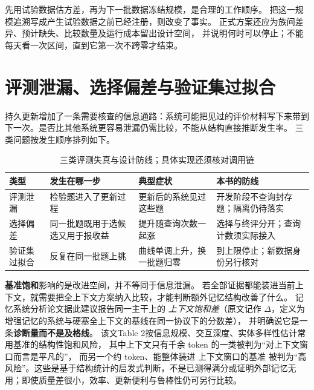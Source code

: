 先用试验数据估方差，再为下一批数据冻结规模，是合理的工作顺序。
把这一规模追溯写成产生试验数据之前已经注册，则改变了事实。
正式方案还应为族间差异、预计缺失、比较数量及运行成本留出设计空间，
并说明何时可以停止；不能每天看一次区间，直到它第一次不跨零才结束。


\section{评测泄漏、选择偏差与验证集过拟合}
\label{sec:ch03-leak}

\begin{sloppypar}
持久更新增加了一条需要核查的信息通路：系统可能把见过的评价材料写下来带到下一次。是否比其他系统更容易泄漏仍需比较，不能从结构直接推断发生率。
三类问题按发生顺序排列如下。
\end{sloppypar}

\begin{table}[htbp]
\centering
\caption{三类评测失真与设计防线；具体实现还须核对调用链}
\label{tab:ch03-leak}
\begin{tabular}{>{\raggedright\arraybackslash}p{2.6cm}>{\raggedright\arraybackslash}p{4.4cm}>{\raggedright\arraybackslash}p{4.0cm}>{\raggedright\arraybackslash}p{2.4cm}}
\toprule
类型 & 发生在哪一步 & 典型症状 & 本书的防线 \\
\midrule
评测泄漏 & 检验题进入了更新过程 & 更新后的系统见过这些题 & 开发阶段不查询封存题；隔离仍待落实 \\
\midrule
选择偏差 & 同一批题既用于选候选又用于报收益 & 提升随查询次数一起涨 & 选择与终评分开；查询计数须实际接入 \\
\midrule
验证集过拟合 & 反复在同一批题上挑 & 曲线单调上升，换一批题归零 & 到上限停止；新数据身份另行核对 \\
\bottomrule
\end{tabular}
\end{table}

\begin{sloppypar}
\textbf{基准饱和}影响的是改进空间，并不等同于信息泄漏。
若全部证据都能装进当前上下文，就需要把全上下文方案纳入比较，才能判断额外记忆结构改善了什么。
记忆系统分析论文据此建议报告同一主干上的\cite{anatomy-memory-2602}
\emph{上下文饱和差}（原文记作 $\Delta$，定义为增强记忆的系统与硬塞全上下文的基线在同一协议下的分数差），
并明确说它是一条\textbf{诊断量而不是及格线}。
该文Table 2按信息规模、交互深度、实体多样性估计常用基准的结构性饱和风险，
其中上下文只有千余 token 的一类被判为“对上下文窗口而言是平凡的”，
而另一个约  token、能整体装进  上下文窗口的基准
被判为“高风险”。这些是基于结构统计的启发式判断，不是已测得满分或证明外部记忆无用；即使质量差很小，效率、更新便利与鲁棒性仍可另行比较。
\end{sloppypar}

